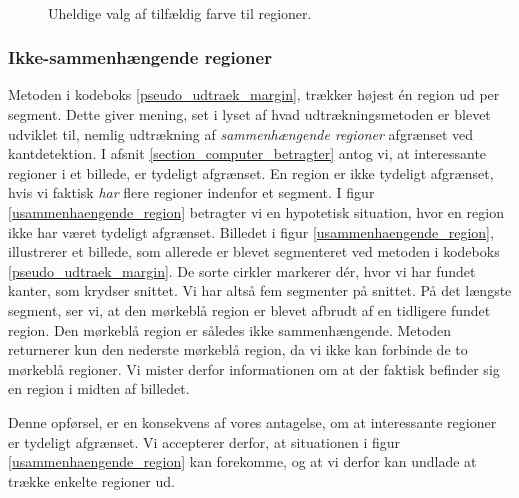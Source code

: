 {\begin{figure}[h]
    \\
    \caption[]{Uheldige valg af tilfældig farve til regioner.}
    \label{floodfill_colors}
\end{figure}

\subsubsection{Ikke-sammenhængende regioner}
Metoden i kodeboks \ref{pseudo_udtraek_margin}, trækker højest én region
ud per segment. Dette giver mening, set i lyset af hvad
udtrækningsmetoden er blevet udviklet til, nemlig udtrækning af
\emph{sammenhængende regioner} afgrænset ved kantdetektion. I afsnit
\ref{section_computer_betragter} antog vi, at interessante regioner i et
billede, er tydeligt afgrænset. En region er ikke tydeligt afgrænset,
hvis vi faktisk \emph{har} flere regioner indenfor et segment. I figur
\ref{usammenhaengende_region} betragter vi en hypotetisk situation, hvor
en region ikke har været tydeligt afgrænset. Billedet i figur
\ref{usammenhaengende_region}, illustrerer et billede, som allerede er
blevet segmenteret ved metoden i kodeboks \ref{pseudo_udtraek_margin}.
De sorte cirkler markerer dér, hvor vi har fundet kanter, som krydser
snittet. Vi har altså fem segmenter på snittet. På det længste segment,
ser vi, at den mørkeblå region er blevet afbrudt af en tidligere fundet
region. Den mørkeblå region er således ikke sammenhængende. Metoden
returnerer kun den nederste mørkeblå region, da vi ikke kan forbinde
de to mørkeblå regioner. Vi mister derfor informationen om at der
faktisk befinder sig en region i midten af billedet.

Denne opførsel, er en konsekvens af vores antagelse, om at interessante
regioner er tydeligt afgrænset. Vi accepterer derfor, at situationen i
figur \ref{usammenhaengende_region} kan forekomme, og at vi derfor kan
undlade at trække enkelte regioner ud.

}
